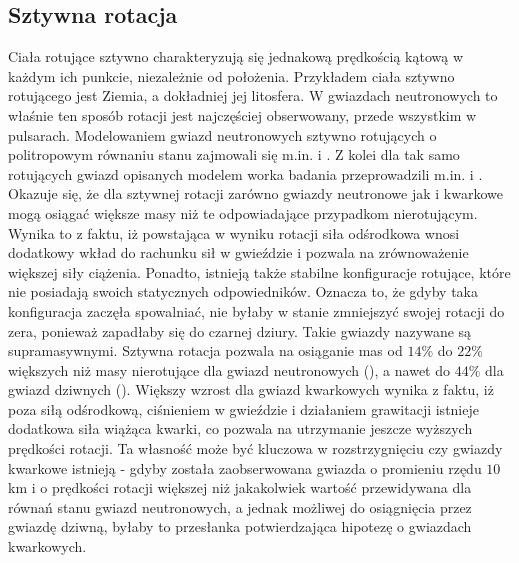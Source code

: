 \documentclass{bachelor_thesis}
\begin{document}
        \subsection{Sztywna rotacja}
        Ciała rotujące sztywno charakteryzują się jednakową prędkością kątową w każdym ich punkcie, niezależnie od położenia. Przykładem ciała sztywno rotującego jest Ziemia, a dokładniej jej litosfera. W gwiazdach neutronowych to właśnie ten sposób rotacji jest najczęściej obserwowany, przede wszystkim w pulsarach. Modelowaniem gwiazd neutronowych sztywno rotujących o politropowym równaniu stanu zajmowali się m.in. \cite{Komatsu1989} i \cite{Cook1994a}. Z kolei dla tak samo rotujących gwiazd opisanych modelem worka badania przeprowadzili m.in. \cite{Gourgoulhon1999} i \cite{Stergioulas1999}.\\
        \indent Okazuje się, że dla sztywnej rotacji zarówno gwiazdy neutronowe jak i kwarkowe mogą osiągać większe masy niż te odpowiadające przypadkom nierotującym. Wynika to z faktu, iż powstająca w wyniku rotacji siła odśrodkowa wnosi dodatkowy wkład do rachunku sił w gwieździe i pozwala na zrównoważenie większej siły ciążenia. Ponadto, istnieją także stabilne konfiguracje rotujące, które nie posiadają swoich statycznych odpowiedników. Oznacza to, że gdyby taka konfiguracja zaczęła spowalniać, nie byłaby w stanie zmniejszyć swojej rotacji do zera, ponieważ zapadłaby się do czarnej dziury. Takie gwiazdy nazywane są supramasywnymi. Sztywna rotacja pozwala na osiąganie mas od $14\%$ do $22\%$ większych niż masy nierotujące dla gwiazd neutronowych (\citealp{Cook1994a}), a nawet do $44\%$ dla gwiazd dziwnych (\citealp{Rosinska2000}). Większy wzrost dla gwiazd kwarkowych wynika z faktu, iż poza siłą odśrodkową, ciśnieniem w gwieździe i działaniem grawitacji istnieje dodatkowa siła wiążąca kwarki, co pozwala na utrzymanie jeszcze wyższych prędkości rotacji. Ta własność może być kluczowa w rozstrzygnięciu czy gwiazdy kwarkowe istnieją - gdyby została zaobserwowana gwiazda o promieniu rzędu $10$ km i o prędkości rotacji większej niż jakakolwiek wartość przewidywana dla równań stanu gwiazd neutronowych, a jednak możliwej do osiągnięcia przez gwiazdę dziwną, byłaby to przesłanka potwierdzająca hipotezę o gwiazdach kwarkowych.\\
\end{document}
